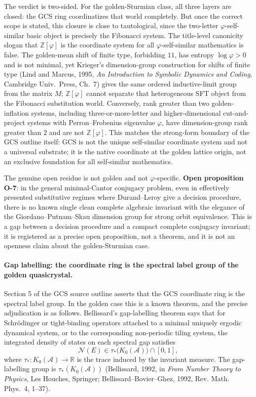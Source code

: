 \documentclass[11pt]{article}
\begin{document}
The verdict is two-sided.  For the golden-Sturmian class, all three layers are closed: the GCS ring coordinatizes that world completely.  But once the correct scope is stated, this closure is close to tautological, since the two-letter $\varphi$-self-similar basic object is precisely the Fibonacci system.  The title-level canonicity slogan that $\mathbb Z[\varphi]$ is the coordinate system for all $\varphi$-self-similar mathematics is false.  The golden-mean shift of finite type, forbidding $11$, has entropy $\log\varphi>0$ and is not minimal, yet Krieger's dimension-group construction for shifts of finite type (Lind and Marcus, 1995, \emph{An Introduction to Symbolic Dynamics and Coding}, Cambridge Univ.\ Press, Ch.\ 7) gives the same ordered inductive-limit group from the matrix $M$; $\mathbb Z[\varphi]$ cannot separate that heterogeneous SFT object from the Fibonacci substitution world.  Conversely, rank greater than two golden-inflation systems, including three-or-more-letter and higher-dimensional cut-and-project systems with Perron--Frobenius eigenvalue $\varphi$, have dimension-group rank greater than $2$ and are not $\mathbb Z[\varphi]$.  This matches the strong-form boundary of the GCS outline itself: GCS is not the unique self-similar coordinate system and not a universal substrate; it is the native coordinate at the golden lattice origin, not an exclusive foundation for all self-similar mathematics.

The genuine open residue is not golden and not $\varphi$-specific.  \textbf{Open proposition O-7}: in the general minimal-Cantor conjugacy problem, even in effectively presented substitutive regimes where Durand--Leroy give a decision procedure, there is no known single clean complete algebraic invariant with the elegance of the Giordano--Putnam--Skau dimension group for strong orbit equivalence.  This is a gap between a decision procedure and a compact complete conjugacy invariant; it is registered as a precise open proposition, not a theorem, and it is not an openness claim about the golden-Sturmian case.

\paragraph{Gap labelling: the coordinate ring is the spectral label group of the golden quasicrystal.}
Section 5 of the GCS source outline asserts that the GCS coordinate ring is the spectral label group.  In the golden case this is a known theorem, and the precise adjudication is as follows.  Bellissard's gap-labelling theorem says that for Schr\"odinger or tight-binding operators attached to a minimal uniquely ergodic dynamical system, or to the corresponding non-periodic tiling system, the integrated density of states on each spectral gap satisfies
$$
  \mathcal N(E)\in \tau_*\bigl(K_0(\mathcal A)\bigr)\cap[0,1],
$$
where $\tau_*:K_0(\mathcal A)\to\mathbb R$ is the trace induced by the invariant measure.  The gap-labelling group is $\tau_*(K_0(\mathcal A))$ (Bellissard, 1992, in \emph{From Number Theory to Physics}, Les Houches, Springer; Bellissard--Bovier--Ghez, 1992, Rev. Math. Phys.\ 4, 1--37).
\end{document}
